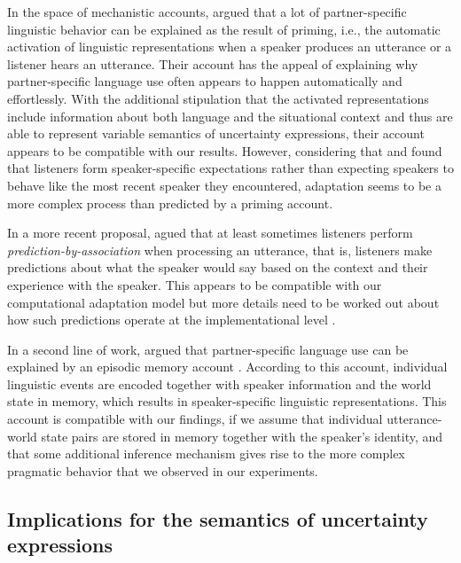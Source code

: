 In the space of mechanistic accounts, \cite{Pickering2004} argued that a lot of partner-specific linguistic behavior
 can be explained as the result of priming, i.e., the automatic activation of linguistic representations when 
a speaker produces an utterance or a listener hears an utterance. Their account has the appeal
of explaining why partner-specific language use often appears to happen automatically and effortlessly. 
With the additional stipulation that the activated representations include information about both language
and the situational context and thus are able to represent variable semantics of uncertainty expressions,
their account appears to be compatible with our results. However, considering that \cite{Yildirim2016} and 
\cite{Schuster2019} found that listeners form speaker-specific expectations rather than expecting speakers
to behave like the most recent speaker they encountered, adaptation seems to be a more complex process than predicted by a
priming account.

In a more recent proposal, \cite{Pickering2013} agued that
at least sometimes listeners perform \textit{prediction-by-association} when processing
an utterance, that is, listeners make predictions about what the speaker would say based on
the context and their experience with the speaker.  This appears to
be compatible with our computational adaptation model but more details need to be
worked out about how such predictions operate at the implementational level \cite{Marr1982}.

In a second line of work, \cite{Horton2005,Horton2016} argued that partner-specific
language use can be explained by an episodic memory account \cite{Goldinger1998,Johnson1997,Pierrehumbert2001}.
According to this account, individual linguistic events are encoded together with
speaker information and the world state in memory, which results in speaker-specific
linguistic representations. This account is compatible with our findings, if we assume
that individual utterance-world state pairs are stored in memory together with the speaker's 
identity, and that some additional inference mechanism gives rise to the more complex
pragmatic behavior that we observed in our experiments.

\subsection{Implications for the semantics of uncertainty expressions}

